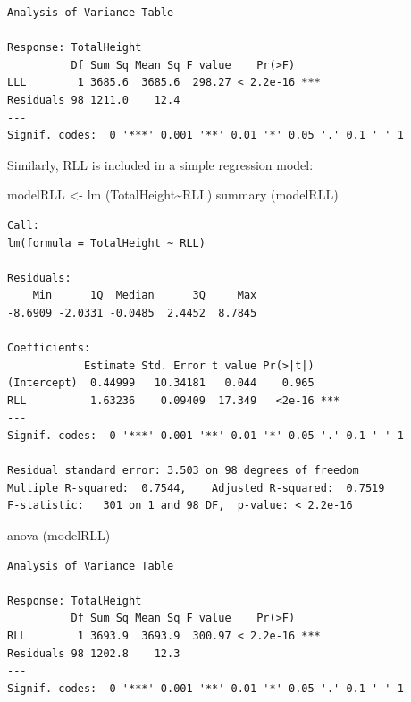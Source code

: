 \documentclass[
  oneside]{krantz}
\newenvironment{Shaded}{\begin{snugshade}}{\end{snugshade}}
\newcommand{\FunctionTok}[1]{\textcolor[rgb]{0.00,0.00,0.00}{#1}}
\newcommand{\NormalTok}[1]{#1}
\newcommand{\OtherTok}[1]{\textcolor[rgb]{0.56,0.35,0.01}{#1}}
\newcommand{\SpecialCharTok}[1]{\textcolor[rgb]{0.00,0.00,0.00}{#1}}
\begin{document}
\begin{verbatim}
Analysis of Variance Table

Response: TotalHeight
          Df Sum Sq Mean Sq F value    Pr(>F)    
LLL        1 3685.6  3685.6  298.27 < 2.2e-16 ***
Residuals 98 1211.0    12.4                      
---
Signif. codes:  0 '***' 0.001 '**' 0.01 '*' 0.05 '.' 0.1 ' ' 1
\end{verbatim}

Similarly, RLL is included in a simple regression model:

\begin{Shaded}
\begin{Highlighting}[]
\NormalTok{modelRLL }\OtherTok{\textless{}{-}} \FunctionTok{lm}\NormalTok{ (TotalHeight}\SpecialCharTok{\textasciitilde{}}\NormalTok{RLL)}
\FunctionTok{summary}\NormalTok{ (modelRLL)}
\end{Highlighting}
\end{Shaded}

\begin{verbatim}
Call:
lm(formula = TotalHeight ~ RLL)

Residuals:
    Min      1Q  Median      3Q     Max 
-8.6909 -2.0331 -0.0485  2.4452  8.7845 

Coefficients:
            Estimate Std. Error t value Pr(>|t|)    
(Intercept)  0.44999   10.34181   0.044    0.965    
RLL          1.63236    0.09409  17.349   <2e-16 ***
---
Signif. codes:  0 '***' 0.001 '**' 0.01 '*' 0.05 '.' 0.1 ' ' 1

Residual standard error: 3.503 on 98 degrees of freedom
Multiple R-squared:  0.7544,    Adjusted R-squared:  0.7519 
F-statistic:   301 on 1 and 98 DF,  p-value: < 2.2e-16
\end{verbatim}

\begin{Shaded}
\begin{Highlighting}[]
\FunctionTok{anova}\NormalTok{ (modelRLL)}
\end{Highlighting}
\end{Shaded}

\begin{verbatim}
Analysis of Variance Table

Response: TotalHeight
          Df Sum Sq Mean Sq F value    Pr(>F)    
RLL        1 3693.9  3693.9  300.97 < 2.2e-16 ***
Residuals 98 1202.8    12.3                      
---
Signif. codes:  0 '***' 0.001 '**' 0.01 '*' 0.05 '.' 0.1 ' ' 1
\end{verbatim}
\end{document}
